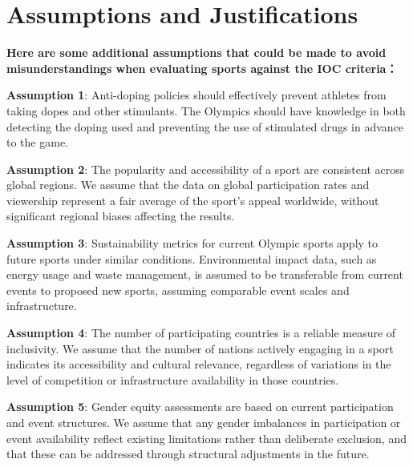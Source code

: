 \documentclass[12pt]{article}
\begin{document}
\section{Assumptions and Justifications}
\textbf{Here are some additional assumptions that could be made to avoid misunderstandings when evaluating sports against the IOC criteria：}

 
\textbf{Assumption 1}: Anti-doping policies should effectively prevent athletes from taking dopes and other stimulants. The Olympics should have knowledge in both detecting the doping used and preventing the use of stimulated drugs in advance to the game. 

\textbf{Assumption 2}: The popularity and accessibility of a sport are consistent across global regions. We assume that the data on global participation rates and viewership represent a fair average of the sport’s appeal worldwide, without significant regional biases affecting the results.
 
\textbf{Assumption 3}: Sustainability metrics for current Olympic sports apply to future sports under similar conditions. Environmental impact data, such as energy usage and waste management, is assumed to be transferable from current events to proposed new sports, assuming comparable event scales and infrastructure.
 
\textbf{Assumption 4}: The number of participating countries is a reliable measure of inclusivity.  We assume that the number of nations actively engaging in a sport indicates its accessibility and cultural relevance, regardless of variations in the level of competition or infrastructure availability in those countries.
 

 
\textbf{Assumption 5}: Gender equity assessments are based on current participation and event structures.  We assume that any gender imbalances in participation or event availability reflect existing limitations rather than deliberate exclusion, and that these can be addressed through structural adjustments in the future.
 
\end{document}
